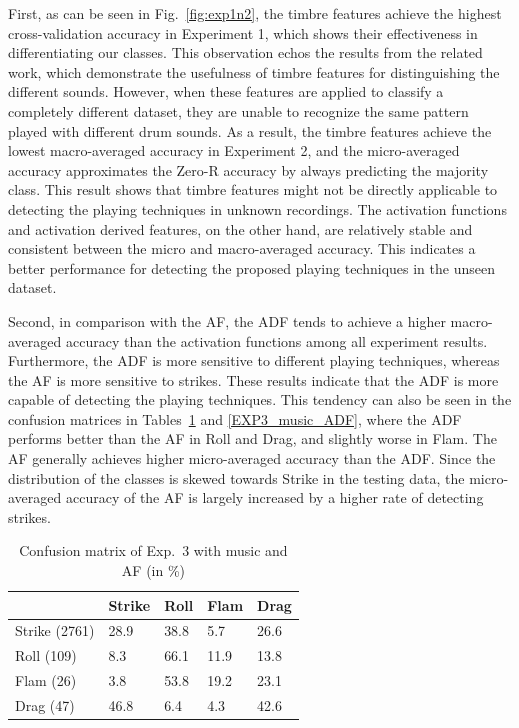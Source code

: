\documentclass{article}
\begin{document}
First,  as can be seen in Fig.~\ref{fig:exp1n2}, the timbre features achieve the highest cross-validation accuracy in Experiment 1, which shows their effectiveness in differentiating our classes. This observation echos the results from the related work, which demonstrate the usefulness of timbre features for distinguishing the different sounds. However, when these features are applied to classify a completely different dataset, they are unable to recognize the same pattern played with different drum sounds. As a result, the timbre features achieve the lowest macro-averaged accuracy in Experiment 2, and the micro-averaged accuracy approximates the Zero-R accuracy by always predicting the majority class. 
This result shows that timbre features might not be directly applicable to detecting the playing techniques in unknown recordings. The activation functions and activation derived features, on the other hand, are relatively stable and consistent between the micro and macro-averaged accuracy. This indicates a better performance for detecting the proposed playing techniques in the unseen dataset. 

Second, in comparison with the AF, the ADF tends to achieve a higher macro-averaged accuracy than the activation functions among all experiment results. Furthermore, the ADF is more sensitive to different playing techniques, whereas the AF is more sensitive to strikes. 
These results indicate that the ADF is more capable of detecting the playing techniques. This tendency can also be seen in the confusion matrices in Tables~\ref{EXP3_music_AF} and \ref{EXP3_music_ADF}, where the ADF performs better than the AF in Roll and Drag, and slightly worse in Flam. The AF generally achieves higher micro-averaged accuracy than the ADF. Since the distribution of the classes is skewed towards Strike in the testing data, the micro-averaged accuracy of the AF is largely increased by a higher rate of detecting strikes.

\begin{table}[]
\centering
\begin{tabular}{l|llll}
       & Strike & Roll & Flam & Drag \\ \hline
Strike (2761) & 28.9   & 38.8 & 5.7  & 26.6 \\
Roll (109)  & 8.3    & 66.1 & 11.9 & 13.8 \\
Flam (26)  & 3.8    & 53.8 & 19.2 & 23.1 \\
Drag (47)  & 46.8   & 6.4  & 4.3  & 42.6
\end{tabular}
\caption{Confusion matrix of Exp.~3 with music and AF (in \%)}
\label{EXP3_music_AF}
\end{table}
\end{document}
